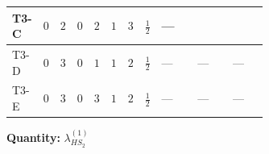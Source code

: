 \documentclass[8pt]{article}
\begin{document}
\begin{landscape}
\begin{longtable}{@{}llcccccc >{\raggedright\arraybackslash}p{0.21\linewidth} >{\raggedright\arraybackslash}p{0.21\linewidth} >{\raggedright\arraybackslash}p{0.21\linewidth}@{}}
\midrule
T3-C & $0$ & $2$ & $0$ & $2$ & $1$ & $3$ & $\frac{1}{2}$ & --- & \scriptsize\adjustbox{max width=\linewidth}{$\begin{gathered} +\frac{9 {g_2}^4}{4}\end{gathered}$} & \scriptsize\adjustbox{max width=\linewidth}{$\begin{gathered} -9 {g_2}^2 {\lambda_{HS_2}^{(1)}}\end{gathered}$} \\
\midrule
T3-D & $0$ & $3$ & $0$ & $1$ & $1$ & $2$ & $\frac{1}{2}$ & --- & --- & --- \\
\midrule
T3-E & $0$ & $3$ & $0$ & $3$ & $1$ & $2$ & $\frac{1}{2}$ & --- & --- & --- \\
\midrule
\bottomrule
\end{longtable}
\clearpage
\noindent\textbf{Quantity: }$\lambda_{HS_2}^{(1)}$\par\smallskip

\end{landscape}
\end{document}
